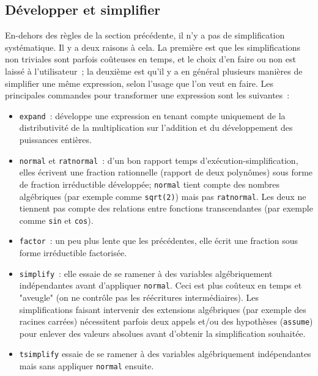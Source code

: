 \documentclass{article}
\begin{document}
\subsection{D\'evelopper et simplifier}
%
En-dehors des r\`egles de la section pr\'ec\'edente,
il n'y a pas de simplification syst\'ematique. 
Il y a deux raisons \`a cela. La premi\`ere est que les 
simplifications non triviales sont parfois
co\^uteuses en temps, et le choix d'en faire ou non est laiss\'e 
\`a l'utilisateur~;
la deuxi\`eme est qu'il y a en g\'en\'eral plusieurs mani\`eres de
simplifier une m\^eme expression, selon l'usage que l'on veut en
faire. 
Les principales commandes pour transformer une expression 
sont les suivantes~:
\begin{itemize}
\item
{}
\verb|expand|~: d\'eveloppe une expression en tenant compte 
uniquement de la distributivit\'e de la multiplication sur l'addition et
du d\'eveloppement des puissances enti\`eres.
\item
{}
\verb|normal| et \verb|ratnormal|~: 
d'un bon rapport temps d'ex\'ecution-simplification, elles
\'ecrivent une fraction rationnelle (rapport de deux polyn\^omes)
sous forme de fraction irr\'eductible d\'evelopp\'ee; \verb|normal|
tient compte des nombres alg\'ebriques (par exemple comme \verb|sqrt(2)|)
mais pas \verb|ratnormal|. Les deux ne tiennent pas compte des relations
entre fonctions transcendantes (par exemple comme \verb|sin| et \verb|cos|).
\item 
{}
\verb|factor|~: un peu plus lente que les pr\'ec\'edentes, elle
\'ecrit une fraction sous forme irr\'eductible factoris\'ee.
\item 
{}
\verb|simplify|~: elle essaie de se ramener \`a
des variables alg\'ebriquement ind\'ependantes avant d'appliquer
\verb|normal|. Ceci est plus co\^uteux en temps et "aveugle" (on
ne contr\^ole pas les r\'e\'ecritures interm\'ediaires).
Les simplifications faisant intervenir des extensions
alg\'ebriques (par exemple des racines carr\'ees) 
n\'ecessitent parfois deux appels et/ou des hypoth\`eses (\verb|assume|)
pour enlever des valeurs absolues avant d'obtenir la simplification
souhait\'ee.
\item 
{}
\verb|tsimplify| essaie de se ramener \`a des variables 
alg\'ebriquement ind\'ependantes mais sans appliquer \verb|normal|
ensuite.
\end{itemize}
\end{document}
